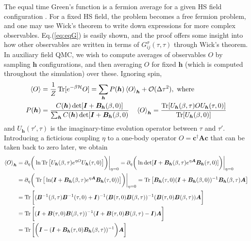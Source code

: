 The equal time Green's function is a fermion average for a given HS field configuration \cite{santos_introduction_2003}.
For a fixed HS field, the problem becomes a free fermion problem, and one may use Wick's theorem to write down expressions for more complex observables.
Eq.(\ref{eq:eqG}) is easily shown, and the proof offers some insight into how other observables are written in terms of $G_{ij}^\sigma (\tau, \tau)$ through Wick's theorem.
In auxiliary field \acs{QMC}, we wish to compute averages of observables $O$ by sampling $\bm h$ configurations, and then averaging $O$ for fixed $\bm h$ (which is computed throughout the simulation) over these.
Ignoring spin,
\begin{equation}
\begin{split}
\left\langle O \right\rangle &= \frac{1}{Z} \operatorname{Tr} [ e^{-\beta \mathcal{H} } O ] = \sum_{\bm h} P (\bm h) \left\langle O \right\rangle_{\bm h} + \mathcal{O}(\Delta \tau^2 ) , \,\,
\text{where} \\
P ( \bm h ) &= \frac{C(\bm h) \det [ \bm I + \bm B_{\bm h} ( \beta, 0 ) ] }{\sum_{\bm h} C(\bm h) \det [ \bm I + \bm B_{\bm h} ( \beta, 0 )} \quad
\left\langle O \right\rangle_{\bm h} = \frac{\operatorname{Tr}[ U_{\bm h} (\beta, \tau) O U_{\bm h} (\tau, 0)]}{\operatorname{Tr} [ U_{\bm h} (\beta, 0) ] } \\
\end{split}
\end{equation}
and $U_{\bm h} ( \tau', \tau)$ is the imaginary-time evolution operator between $\tau$ and $\tau'$.
Introducing a ficticious coupling $\eta$ to a one-body operator $O = \bm c^\dagger \bm A \bm c$ that can be taken back to zero later, we obtain 
\begin{equation}\label{eq:connected}
\begin{split}
\left\langle O \right\rangle_{\bm h} &= \partial_\eta \bigg( \ln \operatorname{Tr} \big[ U_{\bm h} (\beta, \tau ) e^{\eta O} U_{\bm h} (\tau, 0) \big] \bigg) \bigg|_{\eta = 0} = \partial_\eta \bigg( \ln \det [ \bm I + \bm B_{\bm h} ( \beta, \tau ) e^{\eta \bm A} \bm B_{\bm h} (\tau, 0)  ] \bigg) \bigg|_{\eta = 0} \\
&=  \partial_\eta \bigg( \operatorname{Tr} \big[  \ln  ( \bm I + \bm B_{\bm h} ( \beta, \tau ) e^{\eta \bm A} \bm B_{\bm h} (\tau, 0)  ) \big] \bigg) \bigg|_{\eta = 0} = \operatorname{Tr} \big[ \bm B_{\bm h} (\tau, 0) ( \bm I + \bm B_{\bm h} ( \beta, 0 ) )^{-1} \bm B_{\bm h} ( \beta, \tau ) \bm A \big] \\
&= \operatorname{Tr} \bigg[ ( \bm B^{-1} (\beta, \tau) \bm B^{-1} (\tau, 0) + \bm I )^{-1} ( \bm B (\tau, 0) \bm B (\beta, \tau) )^{-1} ( \bm B (\tau, 0) \bm B (\beta, \tau) ) \bm A \bigg]  \\
&= \operatorname{Tr} \bigg[ ( \bm I + \bm B ( \tau, 0 ) \bm B ( \beta, \tau ) )^{-1} ( \bm I +  \bm B ( \tau, 0 ) \bm B ( \beta, \tau ) - \bm I ) \bm A \bigg] \\
&= \operatorname{Tr} \bigg[  \bigg( \bm I - ( \bm I + \bm B_{\bm h} ( \tau, 0 ) \bm B_{\bm h} (\beta, \tau) )^{-1} \bigg) \bm A \bigg]
\end{split}
\end{equation}

